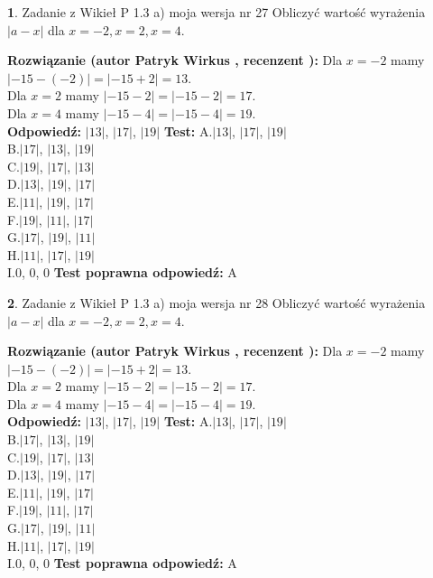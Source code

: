 \documentclass[12pt, a4paper]{article}
\theoremstyle{definition} %
\newtheorem{zad}{}
\newcommand{\zadStart}[1]{\begin{zad}#1\newline}
\newcommand{\zadStop}{\end{zad}}
\newcommand{\rozwStart}[2]{\noindent \textbf{Rozwiązanie (autor #1 , recenzent #2): }\newline}
\newcommand{\rozwStop}{\newline}
\newcommand{\odpStart}{\noindent \textbf{Odpowiedź:}\newline}
\newcommand{\odpStop}{\newline}
\newcommand{\testStart}{\noindent \textbf{Test:}\newline}
\newcommand{\testStop}{\newline}
\newcommand{\kluczStart}{\noindent \textbf{Test poprawna odpowiedź:}\newline}
\newcommand{\kluczStop}{\newline}
\begin{document}
\zadStart{Zadanie z Wikieł P 1.3 a) moja wersja nr 27}
Obliczyć wartość wyrażenia $|a - x|$ dla $x=-2,x=2,x=4$.
\zadStop
\rozwStart{Patryk Wirkus}{}
Dla $x = -2$ mamy $|-15 - (-2)| = |-15 + 2| = 13$.\\
Dla $x = 2$ mamy $|-15 - 2| = |-15 - 2| = 17$.\\
Dla $x = 4$ mamy $|-15 - 4| = |-15 - 4| = 19$.\\
\rozwStop
\odpStart
$|13|$, $|17|$, $|19|$
\odpStop
\testStart
A.$|13|$, $|17|$, $|19|$\\
B.$|17|$, $|13|$, $|19|$\\
C.$|19|$, $|17|$, $|13|$\\
D.$|13|$, $|19|$, $|17|$\\
E.$|11|$, $|19|$, $|17|$\\
F.$|19|$, $|11|$, $|17|$\\
G.$|17|$, $|19|$, $|11|$\\
H.$|11|$, $|17|$, $|19|$\\
I.$0$, $0$, $0$
\testStop
\kluczStart
A
\kluczStop



\zadStart{Zadanie z Wikieł P 1.3 a) moja wersja nr 28}
Obliczyć wartość wyrażenia $|a - x|$ dla $x=-2,x=2,x=4$.
\zadStop
\rozwStart{Patryk Wirkus}{}
Dla $x = -2$ mamy $|-15 - (-2)| = |-15 + 2| = 13$.\\
Dla $x = 2$ mamy $|-15 - 2| = |-15 - 2| = 17$.\\
Dla $x = 4$ mamy $|-15 - 4| = |-15 - 4| = 19$.\\
\rozwStop
\odpStart
$|13|$, $|17|$, $|19|$
\odpStop
\testStart
A.$|13|$, $|17|$, $|19|$\\
B.$|17|$, $|13|$, $|19|$\\
C.$|19|$, $|17|$, $|13|$\\
D.$|13|$, $|19|$, $|17|$\\
E.$|11|$, $|19|$, $|17|$\\
F.$|19|$, $|11|$, $|17|$\\
G.$|17|$, $|19|$, $|11|$\\
H.$|11|$, $|17|$, $|19|$\\
I.$0$, $0$, $0$
\testStop
\kluczStart
A
\kluczStop
\end{document}
